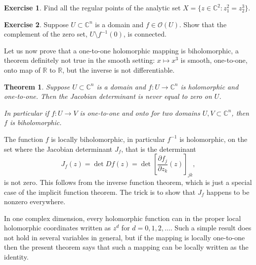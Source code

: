 \documentclass[12pt,openany]{book}
\newcommand{\C}{{\mathbb{C}}}
\newcommand{\R}{{\mathbb{R}}}
\newcommand{\sO}{{\mathcal{O}}}
\theoremstyle{plain}
\newtheorem{thm}{Theorem}[section]
\theoremstyle{remark}
\theoremstyle{definition}
\newenvironment{exbox}{%
    \def\FrameCommand{\vrule width 1pt \relax\hspace {10pt}}%
    \MakeFramed {\advance \hsize -\width \FrameRestore }%
}{%
    \endMakeFramed
}
\theoremstyle{exercise}
\newtheorem{exercise}{Exercise}[section]
\theoremstyle{example}
\begin{document}
\begin{exbox}
\begin{exercise}
Find all the regular points of the analytic set
$X = \bigl\{ z \in \C^2 : z_1^2 = z_2^3 \bigr\}$.
\end{exercise}

\begin{exercise} \label{exercise:connectedcomplement}
Suppose $U \subset \C^n$ is a domain and $f \in \sO(U)$.
Show that the complement of the zero set, $U \setminus f^{-1}(0)$, is
connected.
\end{exercise}
\end{exbox}

Let us now prove that a one-to-one holomorphic
mapping is biholomorphic, a theorem definitely not true in the
smooth setting: $x \mapsto x^3$ is smooth, one-to-one, onto map
of $\R$ to $\R$, but the inverse is not differentiable.

\begin{thm} \label{thm:injective}
Suppose $U \subset \C^n$ is a domain and $f \colon U \to \C^n$ is
holomorphic and one-to-one.  Then the Jacobian determinant is never equal to zero 
on $U$.

In particular if $f \colon U \to V$ is
one-to-one and onto for two domains $U,V \subset \C^n$, then $f$ is
biholomorphic.
\end{thm}

The function $f$ is locally biholomorphic, in particular
$f^{-1}$ is holomorphic,
on the set where the Jacobian determinant $J_f$, that is the determinant
\begin{equation*}
J_f(z) = \det Df(z) = \det \left[ \frac{\partial f_j}{\partial z_k}(z)
\right]_{jk} ,
\end{equation*}
is not zero.  This follows from the inverse function theorem, which is just
a special case of the implicit function theorem.
The trick is to show that $J_f$ happens to be nonzero
everywhere.

In one complex dimension, every holomorphic function can in
the proper local holomorphic coordinates written as $z^d$ for $d=0,1,2,\ldots$.
Such a simple result
does not hold in several variables in general, but if the mapping is
locally one-to-one then the present theorem says that such a mapping can be
locally written as the identity.
\end{document}
